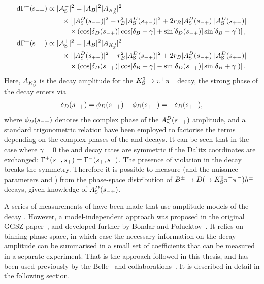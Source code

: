  \begin{subequations}\label{eq:Gamma_Bminus}
\begin{align} 
    \rm {d} \Gamma^-(s_{-+}) &\propto |\mathcal{A}_{\rm S}^-|^2 = |A_{B}|^2|A_{{{K}^0_{\mathrm{S}}}}|^2 \notag \\
    &\qquad\times\left[|A_{\rm S}^{D}(s_{-+})|^2 + r_{B}^2 |A_{\rm S}^{D}(s_{+-})|^2 + 2r_{B} |A_{\rm S}^{D}(s_{-+})||A_{\rm S}^{D}(s_{+-})|\right .
    \notag \\
    &\quad\qquad \left. \times \left(\cos[\delta_D(s_{-+})]\cos[\delta_{B}-\gamma]+\sin[\delta_D(s_{-+})]\sin[\delta_{B}-\gamma]\right)\right], \\
    \rm {d} \Gamma^+(s_{-+}) &\propto |\mathcal{A}_{\rm S}^+|^2 = |A_{B}|^2|A_{{{K}^0_{\mathrm{S}}}}|^2 \notag \\
    &\qquad\times\left[|A_{\rm S}^{D}(s_{+-})|^2 + r_{B}^2 |A_{\rm S}^{D}(s_{-+})|^2 + 2r_{B} |A_{\rm S}^{D}(s_{-+})||A_{\rm S}^{D}(s_{+-})|\right .
    \notag \\
    &\quad\qquad \left. \times \left(\cos[\delta_D(s_{-+})]\cos[\delta_{B}+\gamma]-\sin[\delta_D(s_{-+})]\sin[\delta_{B}+\gamma]\right)\right].
\end{align}
\end{subequations}
Here, $A_{{K}^0_{\mathrm{S}}}$ is the decay amplitude for the ${{K}^0_{\mathrm{S}}}\rightarrow{\ensuremath{{\pi}^+}}{\ensuremath{{\pi}^-}}$ decay, the strong phase of the \D decay enters via 
\begin{align}
    {\delta_\D(\smp) = \phi_D(\smp) - \phi_D(\spm) = - \delta_D(\spm)},
\end{align} where $\phi_D(s_{-+})$ denotes the complex phase of the $A_{\rm S}^{D}(s_{-+})$ amplitude, and a standard trigonometric relation have been employed to factorise the terms depending on the complex phases of the \B and \D decays. It can be seen that in the case where $\gamma=0$ the \Bp and \Bm decay rates are symmetric if the Dalitz coordinates are exchanged: $\Gamma^+(s_-, s_+)=\Gamma^-(s_+, s_-)$. The presence of \CP violation in the \B decay breaks the symmetry. Therefore it is possible to measure \g (and the nuisance parameters \rB and \dB) from the phase-space distribution of ${{B}^\pm}\rightarrow{\ensuremath{D}}(\rightarrow{\ensuremath{{K}^0_{\mathrm{S}}}} \pi^+ \pi^-)h^\pm$ decays, given knowledge of $A_{\rm S}^{D}(s_{-+})$.

A series of measurements of \g have been made that use amplitude models of the \D decay \cite{BABAR2005,BABAR2008,BABAR2010, BELLE2004,BELLE2006,BELLE2010,LHCb-PAPER-2014-017,LHCb-PAPER-2016-007}. However, 
a model-independent approach was proposed in the original GGSZ paper~\cite{giriDeterminingGammaUsing2003}, and developed further by Bondar and Poluektov~\cite{bondarFeasibilityStudyModelindependent2006,bondarUseQuantumcorrelatedD02008}. It relies on binning phase-space, in which case the necessary information on the \D decay amplitude can be summarised in a small set of coefficients that can be measured in a separate experiment. That is the approach followed in this thesis, and has been used previously by the Belle~\cite{BELLEMODIND} and \lhcb collaborations~\cite{LHCb-PAPER-2012-027,LHCb-PAPER-2014-041,LHCb-PAPER-2018-017}. It is described in detail in the following section.

